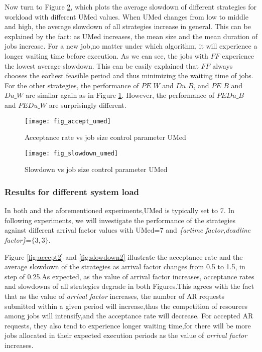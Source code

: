 \documentclass[preprint,12pt]{elsarticle}
\begin{document}
Now turn to Figure \ref{fig:fig42}, which plots the average slowdown of different strategies for workload with different UMed values. When UMed changes from low to middle and high, the average slowdown of all strategies  increase in general. This can be explained by the fact: as UMed increases, the mean size and the mean duration of jobs increase. For a new job,no matter under which algorithm, it will experience a longer waiting time before execution. As we can see, the jobs with $FF$ experience the lowest average slowdown. This can be easily explained that $FF$ always chooses the earliest feasible period and thus minimizing the waiting time of jobs. For the other strategies, the performance of $PE\_W$ and $Du\_B$, and $PE\_B$ and $Du\_W$ are similar again as in Figure \ref{fig:fig41}. However, the performance of $PEDu\_B$ and $PEDu\_W$ are surprisingly different.

\begin{figure}[htp]
\centering
\texttt{[image: fig\_accept\_umed]}
\caption{Acceptance rate vs job size control parameter UMed}
\label{fig:fig41}
\end{figure}



\begin{figure}[htp]
\centering
\texttt{[image: fig\_slowdown\_umed]}
\caption{Slowdown vs job size control parameter UMed}
\label{fig:fig42}
\end{figure}



\subsubsection{Results for different system load}
In both \cite{lublin2003workload} and the aforementioned experiments,UMed is typically set to 7.
In following experiments, we will investigate the performance of the strategies against different arrival factor values with UMed=7 and  \emph{\{artime factor,deadline factor\}}=$\{3,3\}$.

Figure \ref{fig:accept2} and \ref{fig:slowdown2} illustrate the acceptance rate and the average slowdown of the strategies as arrival factor changes from 0.5 to 1.5, in step of 0.25.As expected, as the value of arrival factor increases, acceptance rates and slowdowns of all strategies degrade in both Figures.This agrees with the fact that as the value of \emph{arrival factor} increases, the number of AR requests submitted within a given period will increase,thus the competition of resources among jobs will intensify,and the acceptance rate will decrease. For accepted AR requests, they also tend to experience longer waiting time,for there will be more jobs allocated in their expected execution periods as the value of \emph{arrival factor} increases.
\end{document}

